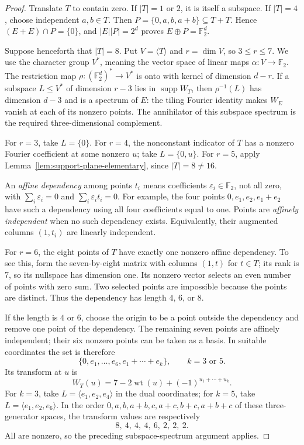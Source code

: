 \documentclass[11pt]{article}
\numberwithin{equation}{section}
\theoremstyle{definition}
\theoremstyle{remark}\newtheorem{remark}[theorem]{Remark}
\newcommand{\F}{\mathbb F_2}
\begin{document}
\begin{proof}
Translate $T$ to contain zero.  If $|T|=1$ or $2$, it is itself a
subspace.  If $|T|=4$, choose independent $a,b\in T$.  Then
$P=\{0,a,b,a+b\}\subseteq T+T$.  Hence $(E+E)\cap P=\{0\}$, and
$|E||P|=2^d$ proves $E\oplus P=\mathbb F_2^d$.

Suppose henceforth that $|T|=8$.  Put $V=\langle T\rangle$ and
$r=\dim V$, so $3\le r\le7$.  We use the character group $V^*$,
meaning the vector space of linear maps $\alpha:V\to\mathbb F_2$.
The restriction map $\rho:(\mathbb F_2^d)^*\to V^*$ is onto with
kernel of dimension $d-r$.  If a subspace $L\le V^*$ of dimension
$r-3$ lies in $\operatorname{supp}W_T$, then $\rho^{-1}(L)$ has
dimension $d-3$ and is a spectrum of $E$: the tiling Fourier identity
makes $W_E$ vanish at each of its nonzero points.  The annihilator of
this subspace spectrum is the required three-dimensional complement.

For $r=3$, take $L=\{0\}$.  For $r=4$, the nonconstant indicator of $T$
has a nonzero Fourier coefficient at some nonzero $u$; take
$L=\{0,u\}$.  For $r=5$, apply
Lemma~\ref{lem:support-plane-elementary}, since $|T|=8\ne16$.

An \emph{affine dependency} among points $t_i$ means coefficients
$\varepsilon_i\in\F$, not all zero, with
$\sum_i\varepsilon_i=0$ and $\sum_i\varepsilon_i t_i=0$.
For example, the four points $0,e_1,e_2,e_1+e_2$ have such a dependency
using all four coefficients equal to one. Points are \emph{affinely
independent} when no such dependency exists. Equivalently, their
augmented columns $(1,t_i)$ are linearly independent.

For $r=6$, the eight points of $T$ have exactly one nonzero affine
dependency.  To see this, form the seven-by-eight matrix with columns
$(1,t)$ for $t\in T$; its rank is $7$, so its nullspace has dimension
one.  Its nonzero vector selects an even number of points with zero sum.
Two selected points are impossible because the points are distinct.
Thus the dependency has length $4$, $6$, or $8$.

If the length is $4$ or $6$, choose the origin to be a point outside the
dependency and remove one point of the dependency.  The remaining seven
points are affinely independent; their six nonzero points can be taken
as a basis.  In suitable coordinates the set is therefore
\[
 \{0,e_1,\ldots,e_6,e_1+\cdots+e_k\},\qquad k=3\text{ or }5.
\]
Its transform at $u$ is
\[
 W_T(u)=7-2\operatorname{wt}(u)+(-1)^{u_1+\cdots+u_k}.
\]
For $k=3$, take $L=\langle e_1,e_2,e_4\rangle$ in the dual
coordinates; for $k=5$, take $L=\langle e_1,e_2,e_6\rangle$.
In the order $0,a,b,a+b,c,a+c,b+c,a+b+c$ of these three-generator
spaces, the transform values are respectively
\[
 8,\ 4,\ 4,\ 4,\ 6,\ 2,\ 2,\ 2.
\]
All are nonzero, so the preceding subspace-spectrum argument applies.


\end{proof}
\end{document}
